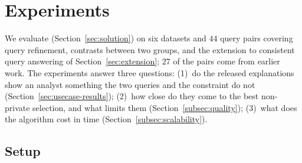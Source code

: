 \section{Experiments}
\label{sec:experiments}

We evaluate \sys{} (Section~\ref{sec:solution}) on six datasets and $44$ query pairs covering query refinement, contrasts between two groups, and the extension to consistent query answering of Section~\ref{sec:extension}; $27$ of the pairs come from earlier work.
The experiments answer three questions:
(1)~do the released explanations show an analyst something the two queries and the constraint do not (Section~\ref{sec:usecase-results});
(2)~how close do they come to the best non-private selection, and what limits them (Section~\ref{subsec:quality});
(3)~what does the algorithm cost in time (Section~\ref{subsec:scalability}).

\subsection{Setup}
\label{subsec:experimental-setup}

\begin{table}[t]
\centering
\small
\caption{Datasets and the source of their query pairs. On IPUMS-CPS $|\mathcal{P}|$ depends on the attribute each question removes.}
\label{tab:datasets}
\setlength{\tabcolsep}{3pt}
\end{table}

